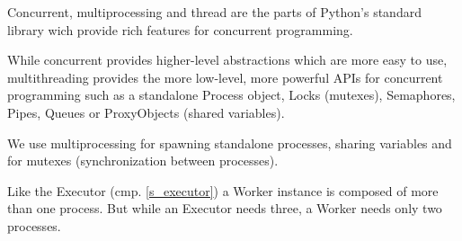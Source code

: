 Concurrent, multiprocessing and thread are the parts of
Python's standard library wich provide rich features for
concurrent programming.

While concurrent provides higher-level abstractions which
are more easy to use, multithreading provides the more
low-level, more powerful APIs for concurrent programming
such as a standalone Process object, Locks (mutexes),
Semaphores, Pipes, Queues or ProxyObjects
(shared variables).

We use multiprocessing for spawning standalone processes,
sharing variables and for mutexes (synchronization between
processes).

Like the Executor (cmp. \ref{s_executor}) a Worker instance
is composed of more than one process. But while an
Executor needs three, a Worker needs only two processes.

